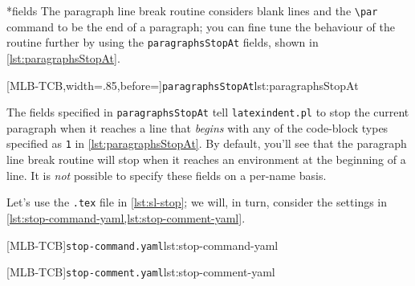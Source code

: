 *{fields}
	The paragraph line break routine considers blank lines and the \lstinline|\par| command to be the end of a paragraph;
	you can fine tune the behaviour of the routine further by using the \texttt{paragraphsStopAt} fields, shown in \cref{lst:paragraphsStopAt}.

	[MLB-TCB,width=.85\linewidth,before=\centering]{\texttt{paragraphsStopAt}}{lst:paragraphsStopAt}

	The fields specified in \texttt{paragraphsStopAt} tell \texttt{latexindent.pl} to stop the current paragraph
	when it reaches a line that \emph{begins} with any of the code-block types specified as \texttt{1} in \cref{lst:paragraphsStopAt}.
	By default, you'll see that the paragraph line break routine will stop when it reaches an environment at the
	beginning of a line. It is \emph{not} possible to specify these fields on a per-name basis.

	Let's use the \texttt{.tex} file in \cref{lst:sl-stop}; we will, in turn, consider the settings in
	\cref{lst:stop-command-yaml,lst:stop-comment-yaml}.

	\begin{minipage}{.45\linewidth}
	\end{minipage}
	\hfill
	\begin{minipage}{.49\linewidth}
		[MLB-TCB]{\texttt{stop-command.yaml}}{lst:stop-command-yaml}

		[MLB-TCB]{\texttt{stop-comment.yaml}}{lst:stop-comment-yaml}
	\end{minipage}

